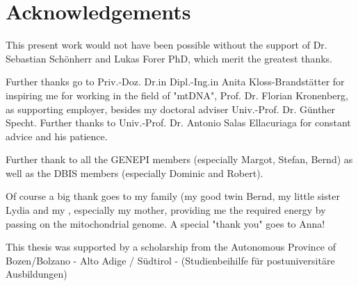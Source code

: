 \section*{Acknowledgements}



This present work would not have been possible without the support of Dr. Sebastian Sch\"onherr and Lukas Forer PhD, which merit the greatest thanks. 

Further thanks go to Priv.-Doz. Dr.in Dipl.-Ing.in Anita Kloss-Brandst\"atter for inspiring me for working in the field of "mtDNA", Prof. Dr. Florian Kronenberg, as supporting employer, besides my doctoral adviser Univ.-Prof. Dr. G\"unther Specht. Further thanks to Univ.-Prof. Dr. Antonio Salas Ellacuriaga for constant advice and his patience.

Further thank to all the GENEPI members (especially Margot, Stefan, Bernd) as well as the DBIS members (especially Dominic and Robert).

Of course a big thank goes to my family (my good twin Bernd, my little sister Lydia and my , especially my mother, providing me the required energy by passing on the mitochondrial genome. A special "thank you" goes to Anna! 


This thesis was supported by a scholarship from the Autonomous Province of Bozen/Bolzano - Alto Adige / S\"udtirol - (Studienbeihilfe f\"ur postuniversit\"are Ausbildungen)

 
%
\cleardoublepage
